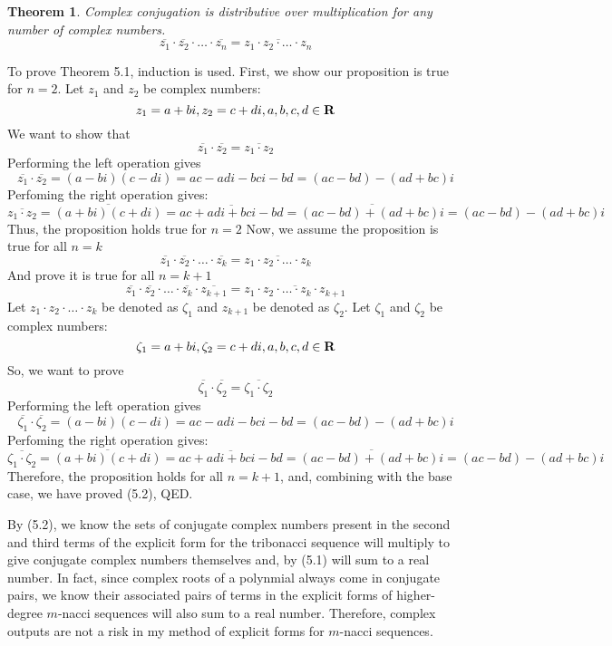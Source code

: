 \documentclass[11pt]{article}
\newtheorem{theorem}{Theorem}[section]
\begin{document}
\begin{theorem}
    Complex conjugation is distributive over multiplication for any number of complex numbers. 
    \[\overline{z_1}\cdot\overline{z_2}\cdot\dots\cdot\overline{z_n}=\overline{z_1\cdot z_2\cdot\dots\cdot z_n}\]
\end{theorem}
To prove Theorem 5.1, induction is used. First, we show our proposition is true for \(n=2\). Let \(z_1\) and \(z_2\) be complex numbers: 
\[z_1=a+bi,z_2=c+di, a,b,c,d\in\mbox{\textbf{R}}\]
We want to show that 
\[\overline{z_1}\cdot\overline{z_2}=\overline{z_1\cdot z_2}\]
Performing the left operation gives 
\[\overline{z_1}\cdot\overline{z_2}=(a-bi)(c-di)=ac-adi-bci-bd=(ac-bd)-(ad+bc)i\]
Perfoming the right operation gives:
\[\overline{z_1 \cdot z_2}=\overline{(a+bi)(c+di)}=\overline{ac+adi+bci-bd}=\overline{(ac-bd)+(ad+bc)i}=(ac-bd)-(ad+bc)i\]
Thus, the proposition holds true for \(n=2\)
Now, we assume the proposition is true for all \(n=k\)
\[\overline{z_1}\cdot\overline{z_2}\cdot\dots\cdot\overline{z_k}=\overline{z_1\cdot z_2\cdot\dots\cdot z_k}\]
And prove it is true for all \(n=k+1\)
\[\overline{z_1}\cdot\overline{z_2}\cdot\dots\cdot\overline{z_k}\cdot\overline{z_{k+1}}=\overline{z_1\cdot z_2\cdot\dots\cdot z_k\cdot z_{k+1}}\]
Let \(z_1\cdot z_2\cdot\dots\cdot z_k\) be denoted as \(\zeta_1\) and \(z_{k+1}\) be denoted as \(\zeta_2\). 
Let \(\zeta_1\) and \(\zeta_2\) be complex numbers:
\[\zeta_1=a+bi,\zeta_2=c+di, a,b,c,d\in\mbox{\textbf{R}}\]
So, we want to prove 
\[\overline{\zeta_1}\cdot\overline{\zeta_2}=\overline{\zeta_1\cdot \zeta_2}\]
Performing the left operation gives 
\[\overline{\zeta_1}\cdot\overline{\zeta_2}=(a-bi)(c-di)=ac-adi-bci-bd=(ac-bd)-(ad+bc)i\]
Perfoming the right operation gives:
\[\overline{\zeta_1 \cdot \zeta_2}=\overline{(a+bi)(c+di)}=\overline{ac+adi+bci-bd}=\overline{(ac-bd)+(ad+bc)i}=(ac-bd)-(ad+bc)i\]
Therefore, the proposition holds for all \(n=k+1\), and, combining with the base case, we have proved (5.2), QED.

By (5.2), we know the sets of conjugate complex numbers present in the second and third terms of the explicit form for the tribonacci sequence will multiply to give conjugate complex numbers themselves and, by (5.1) will sum to a real number. In fact, since complex roots of a polynmial always come in conjugate pairs, we know their associated pairs of terms in the explicit forms of higher-degree \(m\)-nacci sequences will also sum to a real number. Therefore, complex outputs are not a risk in my method of explicit forms for \(m\)-nacci sequences.
\end{document}
